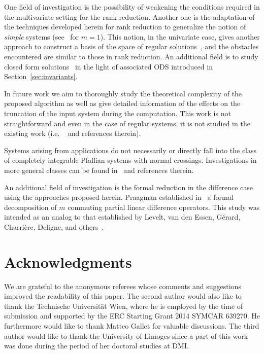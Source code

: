 \documentclass[final,1p,times,number,amsthm]{elsart}
\begin{document}
One field of investigation is the possibility of weakening the conditions required in the multivariate setting for the rank reduction. Another one is the adaptation of the techniques developed herein for rank reduction to generalize the notion of \textit{simple} systems (see~\cite{key40} for
$m=1$). This notion, in the univariate case, gives another approach to construct a basis of the space of regular
solutions~\cite{key25}, and the obstacles encountered are similar to those in rank reduction. An additional field is to study closed form solutions~\cite{key3811}
in the light of associated ODS introduced in Section~\ref{sec:invariants}. 

In future work we aim
to thoroughly study the theoretical complexity of the proposed algorithm as well
as give detailed information of the effects on the truncation of the input
system during the computation. This work is not straightforward and even in the
case of regular systems, it is
not studied in the existing work (i.e. ~\cite[Chapter 3]{key73} and references therein). 

Systems arising from applications do not necessarily or directly fall into the
class of completely integrable Pfaffian systems with normal
crossings. Investigations in more general classes can be found
in~\cite{key32,key3062,key4092} and references therein. 

An additional field of investigation is the formal reduction in the difference
case using the approaches proposed herein. Praagman established
in~\cite{key3239} a formal decomposition of $m$ commuting partial linear
difference operators. This study was intended as an analog to that established
by Levelt, van den Essen, G\'erard, Charri\`ere, Deligne, and
others~\cite{key3,key53,key20,key21}. 

\section*{Acknowledgments}
\label{Ack}
We are grateful to the anonymous referees whose comments and suggestions
improved the readability of this paper. The second author would also like to
thank the Technische Universit\"at Wien, where he is employed by the time of
submission and supported by the ERC Starting Grant 2014 SYMCAR 639270. He
furthermore would like to thank Matteo Gallet for valuable discussions. The
third author would like to thank the University of Limoges since a part of this
work was done during the period of her doctoral studies at DMI.
\end{document}
